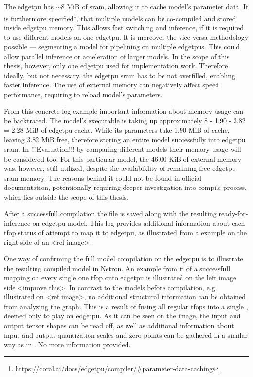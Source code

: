 {

The \gls{edgetpu} has $\sim8$ MiB of \gls{sram}, allowing it to cache model's parameter data. %
It is furthermore specified\footnote{\url{https://coral.ai/docs/edgetpu/compiler/\#parameter-data-caching}},
that multiple models can be co-compiled and stored inside \gls{edgetpu} memory. This allows fast switching and inference, if it is required to use different models on one \gls{edgetpu}.
It is moreover the vice versa methodology possible --- segmenting a model for pipelining on multiple \glspl{edgetpu}. This could allow parallel inference or acceleration of larger models.
In the scope of this thesis, however, only one \gls{edgetpu} used for implementation work. Therefore ideally, but not necessary, the \gls{edgetpu} \gls{sram} has to be not overfilled,
enabling faster inference. The use of external memory can negatively affect speed performance, requiring to reload model's parameters.

From this concrete log example important information about memory usage can be backtraced. The model's executable is taking up approximately 8 - 1.90 - 3.82 = 2.28 MiB of \gls{edgetpu} cache.
While its parameters take 1.90 MiB of cache, leaving 3.82 MiB free, therefore storing an entire model successfully into \gls{edgetpu} \gls{sram}.
In !!!Evaluation!!! by comparing different models their memory usage will be considered too.
For this particular model, the 46.00 KiB of external memory was, however, still utilized, despite the availabiklity of remaining free \gls{edgetpu} \gls{sram} memory.
The reasons behind it could not be found in official documentation, potentionally requiring deeper investigation into compile process, which lies outside the scope of this thesis.

After a successfull compilation the  file is saved along with the resulting ready-for-inference on \gls{edgetpu} model.
This log provides additional information about each \gls{tfop} status of attempt to map it to \gls{edgetpu},
as illustrated from a  example on the right side of an <ref image>.

One way of confirming the full model compilation on the \gls{edgetpu} is to illustrate the resulting compiled model in Netron.
An example from it of a successfull mapping on every single one \gls{tfop} onto \gls{edgetpu} is illustrated on the left image side <improve this>.
In contrast to the models before compilation, e.g. illustrated on <ref image>, no additional structural information can be obtained from analyzing the graph.
This is a result of fusing all regular \glspl{tfop} into a single , deemed only to play on \gls{edgetpu}.
As it can be seen on the image, the input and output tensor shapes can be read off,
as well as additional information about input and output quantization scales and zero-points can be gathered in a similar way as in .
No more information provided.

}
